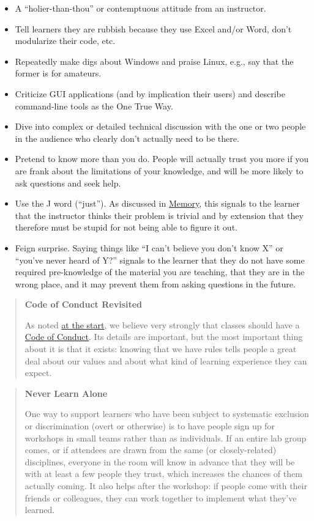 \documentclass[10pt,statementpaper]{memoir}
\begin{document}
\begin{itemize}
\item
  A ``holier-than-thou'' or contemptuous attitude from an instructor.
\item
  Tell learners they are rubbish because they use Excel and/or Word,
  don't modularize their code, etc.
\item
  Repeatedly make digs about Windows and praise Linux, e.g., say that
  the former is for amateurs.
\item
  Criticize GUI applications (and by implication their users) and
  describe command-line tools as the One True Way.
\item
  Dive into complex or detailed technical discussion with the one or two
  people in the audience who clearly don't actually need to be there.
\item
  Pretend to know more than you do. People will actually trust you more
  if you are frank about the limitations of your knowledge, and will be
  more likely to ask questions and seek help.
\item
  Use the J word (``just''). As discussed in \href{memory.html}{Memory},
  this signals to the learner that the instructor thinks their problem
  is trivial and by extension that they therefore must be stupid for not
  being able to figure it out.
\item
  Feign surprise. Saying things like ``I can't believe you don't know
  X'' or ``you've never heard of Y?'' signals to the learner that they
  do not have some required pre-knowledge of the material you are
  teaching, that they are in the wrong place, and it may prevent them
  from asking questions in the future.
\end{itemize}

\begin{quote}
\textbf{Code of Conduct Revisited}

As noted \href{index.html}{at the start}, we believe very strongly that
classes should have a \href{conduct.html}{Code of Conduct}. Its details
are important, but the most important thing about it is that it exists:
knowing that we have rules tells people a great deal about our values
and about what kind of learning experience they can expect.
\end{quote}

\begin{quote}
\textbf{Never Learn Alone}

One way to support learners who have been subject to systematic
exclusion or discrimination (overt or otherwise) is to have people sign
up for workshops in small teams rather than as individuals. If an entire
lab group comes, or if attendees are drawn from the same (or
closely-related) disciplines, everyone in the room will know in advance
that they will be with at least a few people they trust, which increases
the chances of them actually coming. It also helps after the workshop:
if people come with their friends or colleagues, they can work together
to implement what they've learned.
\end{quote}
\end{document}
